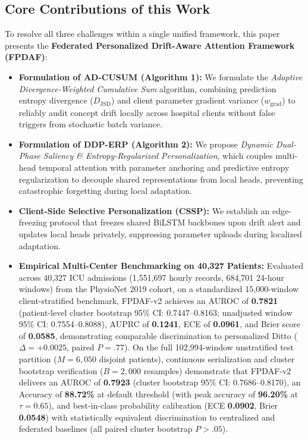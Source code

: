 \documentclass[journal,twocolumn,10pt]{IEEEtran}
\begin{document}
\subsection{Core Contributions of this Work}
To resolve all three challenges within a single unified framework, this paper presents the \textbf{Federated Personalized Drift-Aware Attention Framework (FPDAF)}:
\begin{itemize}
    \item \textbf{Formulation of AD-CUSUM (Algorithm 1):} We formulate the \textit{Adaptive Divergence-Weighted Cumulative Sum} algorithm, combining prediction entropy divergence ($D_{\text{JSD}}$) and client parameter gradient variance ($w_{\text{grad}}$) to reliably audit concept drift locally across hospital clients without false triggers from stochastic batch variance.
    \item \textbf{Formulation of DDP-ERP (Algorithm 2):} We propose \textit{Dynamic Dual-Phase Saliency \& Entropy-Regularized Personalization}, which couples multi-head temporal attention with parameter anchoring and predictive entropy regularization to decouple shared representations from local heads, preventing catastrophic forgetting during local adaptation.
    \item \textbf{Client-Side Selective Personalization (CSSP):} We establish an edge-freezing protocol that freezes shared BiLSTM backbones upon drift alert and updates local heads privately, suppressing parameter uploads during localized adaptation.
        \item \textbf{Empirical Multi-Center Benchmarking on 40,327 Patients:} Evaluated across 40,327 ICU admissions (1,551,697 hourly records, 684,701 24-hour windows) from the PhysioNet 2019 cohort, on a standardized 15,000-window client-stratified benchmark, FPDAF-v2 achieves an AUROC of \textbf{0.7821} (patient-level cluster bootstrap 95\% CI: 0.7447--0.8163; unadjusted window 95\% CI: 0.7554--0.8088), AUPRC of \textbf{0.1241}, ECE of \textbf{0.0961}, and Brier score of \textbf{0.0585}, demonstrating comparable discrimination to personalized Ditto ($\Delta = +0.0025$, paired $P = .77$). On the full 102,994-window unstratified test partition ($M=6,050$ disjoint patients), continuous serialization and cluster bootstrap verification ($B=2,000$ resamples) demonstrate that FPDAF-v2 delivers an AUROC of \textbf{0.7923} (cluster bootstrap 95\% CI: 0.7686--0.8170), an Accuracy of \textbf{88.72\%} at default threshold (with peak accuracy of \textbf{96.20\%} at $\tau=0.65$), and best-in-class probability calibration (ECE \textbf{0.0902}, Brier \textbf{0.0548}) with statistically equivalent discrimination to centralized and federated baselines (all paired cluster bootstrap $P > .05$).

\end{itemize}
\end{document}
